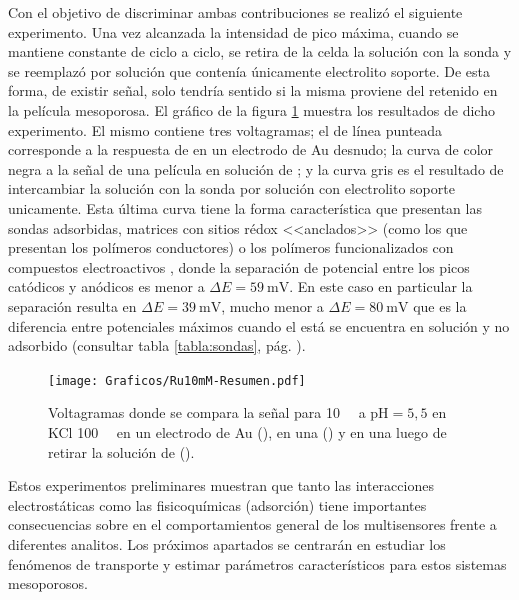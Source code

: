		Con el objetivo de discriminar ambas contribuciones se realizó el siguiente experimento. Una vez alcanzada la intensidad de pico máxima, cuando se mantiene constante de ciclo a ciclo, se retira de la celda la solución con la sonda y se reemplazó por solución que contenía únicamente electrolito soporte. De esta forma, de existir señal, solo tendría sentido si la misma proviene del \ru\space retenido en la película mesoporosa. El gráfico de la figura \ref{fig:Ru10mM-resumen} muestra los resultados de dicho experimento. El mismo contiene tres voltagramas; el de línea punteada corresponde a la respuesta de \ru\space en un electrodo de Au desnudo; la curva de color negra a la señal de una película en solución de \ru; y la curva gris es el resultado de intercambiar la solución con la sonda por solución con electrolito soporte unicamente. Esta última curva tiene la forma característica que presentan las sondas adsorbidas, matrices con sitios rédox <<anclados>>\cite{ybarra2005,ybarra2007} (como los que presentan los polímeros conductores) o los polímeros funcionalizados con compuestos electroactivos \cite{Rohlfing2005,Vila2015}, donde la separación de potencial entre los picos catódicos y anódicos es menor a $\Delta E = \SI{59}{\milli\volt}$. En este caso en particular la separación resulta en $\Delta E = \SI{39}{\milli\volt}$, mucho menor a $\Delta E = \SI{80}{\milli\volt}$ que es la diferencia entre potenciales máximos cuando el \ru\space está se encuentra en solución y no adsorbido (consultar tabla \ref{tabla:sondas}, pág. \pageref{tabla:sondas})\cite{Wi2000}.

				\begin{figure}[h!]
				\centering
				\texttt{[image: Graficos/Ru10mM-Resumen.pdf]}
		        \caption{Voltagramas donde se compara la señal para \ru\space \SI{10}{\milli\Molar} a $\text{pH}=5,5$ en KCl \SI{100}{\milli\Molar} en un electrodo de Au (\usebox{\punteado}), en una \pdmF\space(\usebox{\gris}) y en una \pdmF\space luego de retirar la solución de \ru (\usebox{\negro}).}
		        \label{fig:Ru10mM-resumen}
		      	\end{figure}

		\vspace*{3mm}Estos experimentos preliminares muestran que tanto las interacciones electrostáticas como las fisicoquímicas (adsorción) tiene importantes consecuencias sobre en el comportamientos general de los multisensores frente a diferentes analitos. 
		Los próximos apartados se  centrarán en estudiar los fenómenos de transporte y estimar parámetros característicos para estos sistemas mesoporosos.

